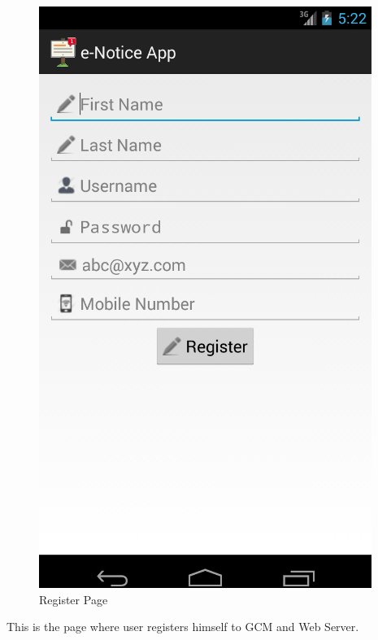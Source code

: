 \begin{figure}[H]
\centering \includegraphics[scale=0.7]{image/register.png}
\caption{Register Page}
\end{figure}
This is the page where user registers himself to GCM and Web Server.

